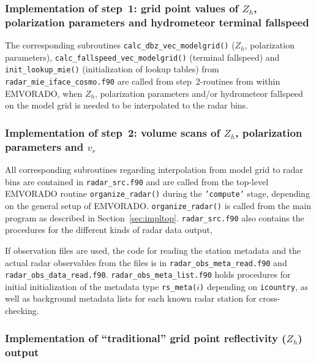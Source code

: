 \documentclass[10pt,a4paper,twoside,headinclude,footinclude,parskip=half]{scrartcl}
\newcommand{\myaktuellesection}{sec:intro}%
\newcommand{\labelsec}[1]{\label{#1}\renewcommand{\myaktuellesection}{#1}}%
\newcommand{\labelsec}[1]{\label{#1}}%
\newcommand{\srcform}[1]{\mbox{\texttt{#1}}\xspace}%
\begin{document}
\subsubsection{Implementation of step~1: grid point values of $Z_h$, polarization parameters and hydrometeor terminal fallspeed}

\labelsec{sec:impl1}

The corresponding subroutines \srcform{calc_dbz_vec_modelgrid()} ($Z_h$, polarization parameters), \srcform{calc_fallspeed_vec_modelgrid()} (terminal fallspeed) and \srcform{init_lookup_mie()} (initialization of lookup tables)
from \srcform{radar_mie_iface_cosmo.f90}
are called from step~2-routines from within EMVORADO, when $Z_h$, polarization parameters and/or hydrometeor fallspeed on the model grid is needed to be
interpolated to the radar bins.


\subsubsection{Implementation of step~2: volume scans of $Z_h$, polarization parameters and $v_r$}

\labelsec{sec:impl2}

All corresponding subroutines regarding interpolation from model grid to radar bins
are contained in \srcform{radar_src.f90} and are called from the top-level
EMVORADO routine \srcform{organize_radar()} during the \srcform{'compute'} stage, depending on the general
setup of EMVORADO. \srcform{organize_radar()} is called from the main program as described in Section~\ref{sec:impltop}.
\srcform{radar_src.f90} also contains the procedures for the different kinds of radar data output,

If observation files are used, the code for reading the station metadata and the actual radar observables
from the files is in \srcform{radar_obs_meta_read.f90} and \srcform{radar_obs_data_read.f90}.
\srcform{radar_obs_meta_list.f90} holds procedures for initial initialization of
the metadata type \srcform{rs_meta($i$)} depending on \srcform{icountry}, as well
as background metadata lists for each known radar station for cross-checking.

\subsubsection{Implementation of ``traditional'' grid point reflectivity ($Z_h$) output}

\labelsec{sec:impltradi}
\end{document}
